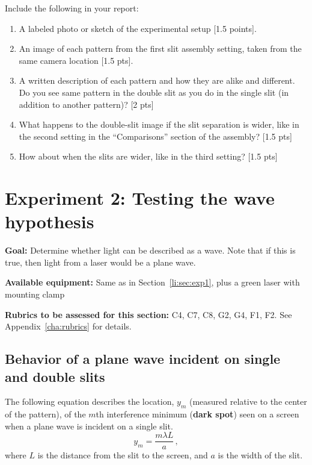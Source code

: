 Include the following in your report:
\begin{enumerate}
	\item A labeled photo or sketch of the experimental setup [1.5 points].
	
	\item An image of each pattern from the first slit assembly setting, taken from the same camera location [1.5 pts].
	
	\item A written description of each pattern and how they are alike and different. Do you see same pattern in the double slit as you do in the single slit (in addition to another pattern)? [2 pts]
	
	\item What happens to the double-slit image if the slit separation is wider, like in the second setting in the ``Comparisons'' section of the assembly? [1.5 pts]
	
	\item How about when the slits are wider, like in the third setting? [1.5 pts]
\end{enumerate}

\section{Experiment 2: Testing the wave hypothesis}

\textbf{Goal:} Determine whether light can be described as a wave. Note that if this is true, then light from a laser would be a plane wave.



\textbf{Available equipment:} Same as in Section~\ref{li:sec:exp1}, plus a green laser with mounting clamp

\textbf{Rubrics to be assessed for this section:} C4, C7, C8, G2, G4, F1, F2. See Appendix~\ref{cha:rubrics} for details.

\subsection{Behavior of a plane wave incident on single and double slits}

The following equation describes the location, $y_m$ (measured relative to the center of the pattern), of the $m$th interference minimum (\textbf{dark spot}) seen on a screen when a plane wave is incident on a single slit.
\begin{equation}
y_m = \frac{m \lambda L}{a} \,,
\end{equation}
where $L$ is the distance from the slit to the screen, and $a$ is the width of the slit.

